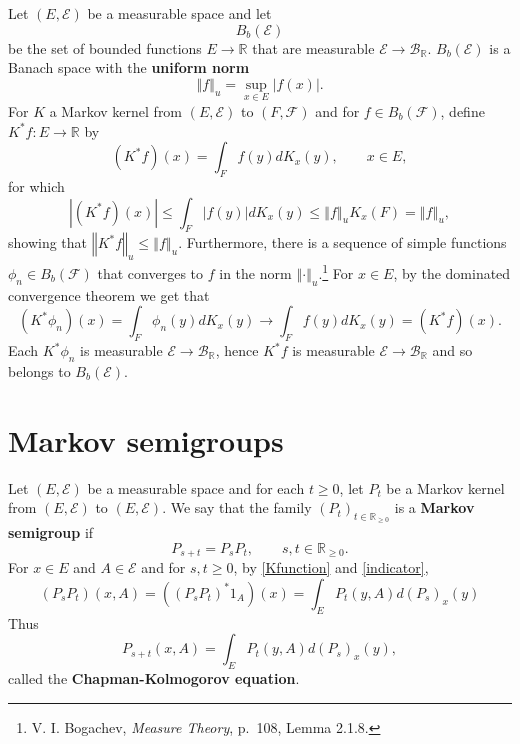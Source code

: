\documentclass{article}
\newcommand{\norm}[1]{\left\Vert #1 \right\Vert}
\theoremstyle{definition}
\theoremstyle{definition}
\begin{document}
Let $(E,\mathscr{E})$ be a measurable space and let
\[
B_b(\mathscr{E})
\]
 be the set of bounded  functions
$E \to \mathbb{R}$ that are measurable $\mathscr{E} \to \mathscr{B}_{\mathbb{R}}$. $B_b(\mathscr{E})$ is a Banach space with the \textbf{uniform norm}
\[
\norm{f}_u = \sup_{x \in E} |f(x)|. 
\]
For $K$ a Markov kernel from $(E,\mathscr{E})$ to $(F,\mathscr{F})$
and for $f \in B_b(\mathscr{F})$, define
$K^*f:E \to \mathbb{R}$ by
\[
(K^*f)(x) = \int_F f(y) dK_x(y), \qquad x \in E,
\]
for which
\[
|(K^*f)(x)| \leq \int_F |f(y)| dK_x(y) \leq \norm{f}_u K_x(F) = \norm{f}_u,
\]
showing that $\norm{K^*f}_u \leq \norm{f}_u$. Furthermore,
there is a sequence of simple functions
$\phi_n \in B_b(\mathscr{F})$ that converges 
to $f$ in the norm $\norm{\cdot}_u$.\footnote{V. I. Bogachev, {\em Measure Theory}, p.~108, Lemma 2.1.8.}
For $x \in E$, by the dominated convergence theorem we get that
\[
(K^*\phi_n)(x) = \int_F \phi_n(y) dK_x(y) \to \int_F f(y) dK_x(y) = (K^*f)(x).
\]
Each $K^*\phi_n$ is measurable $\mathscr{E} \to \mathscr{B}_{\mathbb{R}}$, hence
$K^*f$ is measurable $\mathscr{E} \to \mathscr{B}_{\mathbb{R}}$ and so belongs to $B_b(\mathscr{E})$. 



\section{Markov semigroups}
Let $(E,\mathscr{E})$ be a measurable space 
and for each $t \geq 0$, let $P_t$ be a Markov kernel from
$(E,\mathscr{E})$ to $(E,\mathscr{E})$. We say
that the family $(P_t)_{t \in \mathbb{R}_{\geq 0}}$ is a \textbf{Markov semigroup}
if 
\[
P_{s+t} = P_s P_t, \qquad s, t \in \mathbb{R}_{\geq 0}.
\]
For $x \in E$ and $A \in \mathscr{E}$ and for $s,t \geq 0$, by  \eqref{Kfunction} and
\eqref{indicator},
\[
(P_s P_t)(x,A) = ((P_s P_t)^*1_A)(x)= \int_E P_t(y,A) d(P_s)_x(y)
\]
Thus
\begin{equation}
P_{s+t}(x,A) = \int_E P_t(y,A) d(P_s)_x(y),
\label{chapman}
\end{equation}
called the \textbf{Chapman-Kolmogorov equation}.
\end{document}
